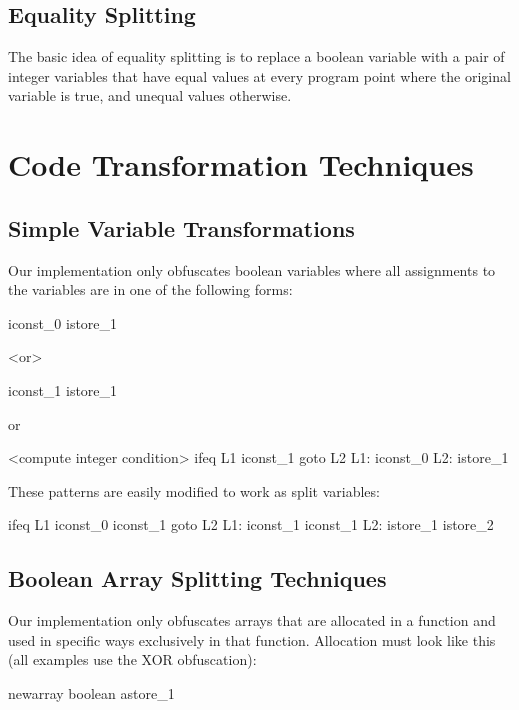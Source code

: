 \subsection{Equality Splitting}

The basic idea of equality splitting is to replace a boolean variable with a
pair of integer variables that have equal values at every program point where
the original variable is true, and unequal values otherwise.

\section{Code Transformation Techniques}

\subsection{Simple Variable Transformations}

Our implementation only obfuscates boolean variables where all assignments to
the variables are in one of the following forms:

\begin{listing}{1}
iconst_0
istore_1

<or>

iconst_1
istore_1
\end{listing}

or

\begin{listing}{1}
<compute integer condition>
ifeq L1
iconst_1
goto L2
L1:
iconst_0
L2:
istore_1
\end{listing}

These patterns are easily modified to work as split variables:

\begin{listing}{1}
ifeq L1
iconst_0
iconst_1
goto L2
L1:
iconst_1
iconst_1
L2:
istore_1
istore_2
\end{listing}

\subsection{Boolean Array Splitting Techniques}

Our implementation only obfuscates arrays that are allocated in a function and
used in specific ways exclusively in that function.  Allocation must look like this 
(all examples use the XOR obfuscation):

\begin{listing}{1}
newarray boolean
astore_1
\end{listing}

